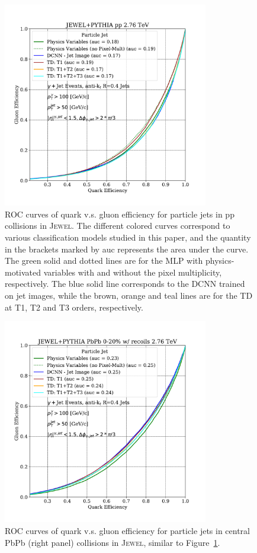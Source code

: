 \documentclass[notoc,preprintnumbers]{JHEP3}
\begin{document}
\begin{figure}[h]
	\centering
	\includegraphics[width=0.8\textwidth]{plots/JEWELPYTHIA_pp_2p76TeV_genLevel_QvsG.pdf}
	\caption{ROC curves of quark v.s. gluon efficiency for particle jets in pp collisions in \textsc{Jewel}. The different colored curves correspond to various classification models studied in this paper, and the quantity in the brackets marked by auc represents the area under the curve. The green solid and dotted lines are for the MLP with physics-motivated variables with and without the pixel multiplicity, respectively. The blue solid line corresponds to the DCNN trained on jet images, while the brown, orange and teal lines are for the TD at T1, T2 and T3 orders, respectively.}
\label{fig:ROC_pp}
\end{figure}

\begin{figure}[h]
	\centering
	\includegraphics[width=0.8\textwidth]{plots/JEWELPYTHIA_PbPb_2p76TeV_genLevel_QvsG.pdf}
	\caption{ROC curves of quark v.s. gluon efficiency for particle jets in central PbPb (right panel) collisions in \textsc{Jewel}, similar to Figure~\ref{fig:ROC_pp}.}
\label{fig:ROC_pbpb}
\end{figure}
\end{document}
